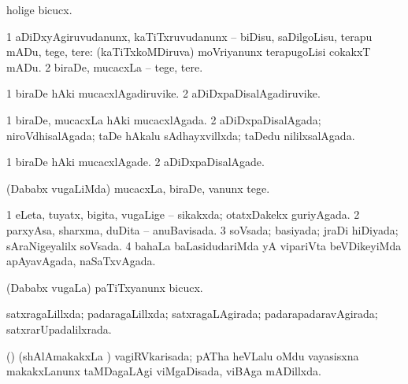 {{\bentry
{} 
\gl{\akirx}
\expl{}
\bmng
holige bicucx. 
\emng
\eentry

\bentry
{} 
\gl{\akirx}
\bmng
\bnum
\num{1} aDiDxyAgiruvudanunx, kaTiTxruvudanunx -- biDisu, saDilgoLisu, terapu mADu, tege, tere:  (kaTiTxkoMDiruva) moVriyanunx terapugoLisi cokakxT mADu. 
\num{2} biraDe, mucacxLa -- tege, tere. 
\enum
\emng
\eentry

\bentry
{} 
\gl{\nA}
\expl{}
\bmng
\bnum
\num{1} biraDe hAki mucacxlAgadiruvike. 
\num{2} aDiDxpaDisalAgadiruvike. 
\enum
\emng
\eentry

\bentry
{} 
\gl{\gu}
\expl{}
\bmng
\bnum
\num{1} biraDe, mucacxLa hAki mucacxlAgada. 
\num{2} aDiDxpaDisalAgada; niroVdhisalAgada; taDe hAkalu sAdhayxvillxda; taDedu nililxsalAgada. 
\enum
\emng
\eentry

\bentry
{} 
\gl{\kirxvi}
\expl{}
\bmng
\bnum
\num{1} biraDe hAki mucacxlAgade. 
\num{2} aDiDxpaDisalAgade. 
\enum
\emng
\eentry

\bentry
{} 
\gl{\sakirx}
\expl{}
\bmng
(Dababx \mo vugaLiMda) mucacxLa, biraDe, \mo vanunx tege. 
\emng
\eentry

\bentry
{} 
\gl{\gu}
\expl{}
\bmng
\bnum
\num{1} eLeta, tuyatx, bigita, \mo vugaLige -- sikakxda; otatxDakekx guriyAgada. 
\num{2} parxyAsa, sharxma, duDita -- anuBavisada. 
\num{3} soVsada; basiyada; jraDi hiDiyada; sAraNigeyalilx soVsada. 
\num{4} bahaLa baLasidudariMda yA vipariVta beVDikeyiMda apAyavAgada, naSaTxvAgada. 
\enum
\emng
\eentry

\bentry
{} 
\gl{\sakirx}
\bmng
(Dababx \mo vugaLa) paTiTxyanunx bicucx. 
\emng
\eentry

\bentry
{} 
\gl{\gu}
\expl{}
\bmng
satxragaLillxda; padaragaLillxda; satxragaLAgirada; padarapadaravAgirada; satxrarUpadalilxrada. 
\emng
\eentry

\bentry
{} 
\gl{\gu}
\expl{}
\bmng
(\birx) (shAlAmakakxLa \vi) vagiRVkarisada; pATha heVLalu oMdu vayasisxna makakxLanunx taMDagaLAgi viMgaDisada, viBAga mADillxda. 
\emng
\eentry

}}
